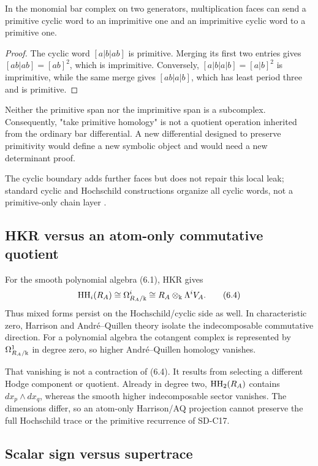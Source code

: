 \begin{proposition}
\label{prop:primitive-boundary}
In the monomial bar complex on two generators, multiplication faces can send
a primitive cyclic word to an imprimitive one and an imprimitive cyclic word
to a primitive one.
\end{proposition}

\begin{proof}
The cyclic word $[a|b|ab]$ is primitive.  Merging its first two entries gives
$[ab|ab]=[ab]^2$, which is imprimitive.  Conversely,
$[a|b|a|b]=[a|b]^2$ is imprimitive, while the same merge gives
$[ab|a|b]$, which has least period three and is primitive.
\end{proof}

Neither the primitive span nor the imprimitive span is a subcomplex.
Consequently, "take primitive homology" is not a quotient operation inherited
from the ordinary bar differential.  A new differential designed to preserve
primitivity would define a new symbolic object and would need a new
determinant proof.

The cyclic boundary adds further faces but does not repair this local leak;
standard cyclic and Hochschild constructions organize all cyclic words, not a
primitive-only chain layer \citep{loday1998}.

\subsection{HKR versus an atom-only commutative quotient}

For the smooth polynomial algebra (6.1), HKR gives
\[
  \operatorname{HH}_i(R_A)\cong\Omega^i_{R_A/\Bbbk}
  \cong R_A\otimes_\Bbbk\Lambda^iV_A.
  \tag{6.4}
\]
Thus mixed forms persist on the Hochschild/cyclic side as well.  In
characteristic zero, Harrison and André--Quillen theory isolate the
indecomposable commutative direction.  For a polynomial algebra the
cotangent complex is represented by $\Omega^1_{R_A/\Bbbk}$ in degree zero, so
higher André--Quillen homology vanishes.

That vanishing is not a contraction of (6.4).  It results from selecting a
different Hodge component or quotient.  Already in degree two,
$\operatorname{HH}_2(R_A)$ contains $dx_p\wedge dx_q$, whereas the smooth higher
indecomposable sector vanishes.  The dimensions differ, so an atom-only
Harrison/AQ projection cannot preserve the full Hochschild trace or the
primitive recurrence of SD-C17.

\subsection{Scalar sign versus supertrace}

